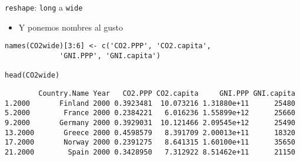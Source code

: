 \documentclass[xcolor={usenames,svgnames,dvipsnames}]{beamer}
\begin{document}
\begin{frame}[fragile,label=sec-4-7]{\texttt{reshape}: \texttt{long} a \texttt{wide}}
 \begin{itemize}
\item Y ponemos nombres al gusto
\end{itemize}
\lstset{language=R,numbers=none}
\begin{lstlisting}
names(CO2wide)[3:6] <- c('CO2.PPP', 'CO2.capita',
			 'GNI.PPP', 'GNI.capita')

head(CO2wide)
\end{lstlisting}

\begin{verbatim}
        Country.Name Year   CO2.PPP CO2.capita     GNI.PPP GNI.capita
1.2000       Finland 2000 0.3923481  10.073216 1.31880e+11      25480
5.2000        France 2000 0.2384221   6.016236 1.55899e+12      25660
9.2000       Germany 2000 0.3929031  10.121466 2.09545e+12      25490
13.2000       Greece 2000 0.4598579   8.391709 2.00013e+11      18320
17.2000       Norway 2000 0.2391275   8.641315 1.60100e+11      35650
21.2000        Spain 2000 0.3428950   7.312922 8.51462e+11      21150
\end{verbatim}
\end{frame}
\end{document}
